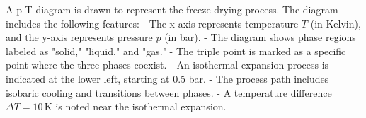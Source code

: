 A p-T diagram is drawn to represent the freeze-drying process. The diagram includes the following features:  
- The x-axis represents temperature \( T \) (in Kelvin), and the y-axis represents pressure \( p \) (in bar).  
- The diagram shows phase regions labeled as "solid," "liquid," and "gas."  
- The triple point is marked as a specific point where the three phases coexist.  
- An isothermal expansion process is indicated at the lower left, starting at 0.5 bar.  
- The process path includes isobaric cooling and transitions between phases.  
- A temperature difference \( \Delta T = 10 \, \text{K} \) is noted near the isothermal expansion.